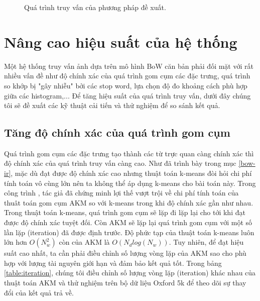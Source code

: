 \begin{figure}[!htbp]
\begin{center}
    \fi
    \caption[Quá trình truy vấn của phương pháp đề xuất]{Quá trình truy vấn của phương pháp đề xuất.}
    \label{FigQueryProcess}
  \end{center}
\end{figure}

\section{Nâng cao hiệu suất của hệ thống}
Một hệ thống truy vấn ảnh dựa trên mô hình BoW căn bản phải đối mặt với rất nhiều vấn đề như độ chính xác của quá trình gom cụm các đặc trưng, quá trình so khớp bị "gây nhiễu" bởi các stop word, lựa chọn độ đo khoảng cách phù hợp giữa các histogram,... Để tăng hiệu suất của quá trình truy vấn, dưới đây chúng tôi sẽ đề xuất các kỹ thuật cải tiến và thử nghiệm để so sánh kết quả.

\subsection{Tăng độ chính xác của quá trình gom cụm}
Quá trình gom cụm các đặc trưng tạo thành các từ trực quan càng chính xác thì độ chính xác của quá trình truy vấn càng cao. Như đã trình bày trong mục \ref{bow-ir}, mặc dù đạt được độ chính xác cao nhưng thuật toán k-means đòi hỏi chi phí tính toán vô cùng lớn nên ta không thể áp dụng k-means cho bài toán này. Trong công trình \cite{philbin2007object}, tác giả đã chứng minh lợi thế vượt trội về chi phí tính toán của thuât toán gom cụm AKM so với k-means trong khi độ chính xác gần như nhau. Trong thuật toán k-means, quá trình gom cụm sẽ lặp đi lặp lại cho tới khi đạt được độ chính xác tuyệt đối. Còn AKM sẽ lặp lại quá trình gom cụm với một số lần lặp (iteration) đã được định trước. Độ phức tạp của thuật toán k-means luôn lớn hơn $O(N^2_w)$ còn của AKM là $O(N_d log(N_w))$. Tuy nhiên, để đạt hiệu suất cao nhất, ta cần phải điều chỉnh số lượng vòng lặp của AKM sao cho phù hợp với lượng tài nguyên giới hạn và đảm bảo kết quả tốt. Trong bảng \ref{table:iteration}, chúng tôi điều chỉnh số lượng vòng lặp (iteration) khác nhau của thuật toán AKM và thử nghiệm trên bộ dữ liệu Oxford 5k để theo dõi sự thay đổi của kết quả trả về.

